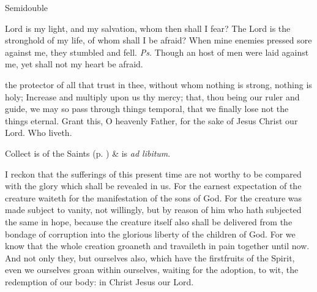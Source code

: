 \begin{inhead}
    {Semidouble}
\end{inhead}

\properantiphonfix

\introit
{} Lord is my light, and my salvation, whom then shall I fear? The Lord is the stronghold of my life, of whom shall I be afraid? When mine enemies pressed sore against me, they stumbled and fell. \textit{Ps.} Though an host of men were laid against me, yet shall not my heart be afraid.

\collect
{} the protector of all that trust in thee, without whom nothing is strong, nothing is holy; Increase and multiply upon us thy mercy; that, thou being our ruler and guide, we may so pass through things temporal, that we finally lose not the things eternal. Grant this, O heavenly Father, for the sake of Jesus Christ our Lord. Who liveth.
\begin{rubric}
     Collect is of the Saints (p. \pageref{SPSaints}) \&  is \emph{ad libitum}.
\end{rubric}

 I reckon that the sufferings of this present time are not worthy to be compared with the glory which shall be revealed in us. For the earnest expectation of the creature waiteth for the manifestation of the sons of God. For the creature was made subject to vanity, not willingly, but by reason of him who hath subjected the same in hope, because the creature itself also shall be delivered from the bondage of corruption into the glorious liberty of the children of God. For we know that the whole creation groaneth and travaileth in pain together until now. And not only they, but ourselves also, which have the firstfruits of the Spirit, even we ourselves groan within ourselves, waiting for the adoption, to wit, the redemption of our body: in Christ Jesus our Lord.


